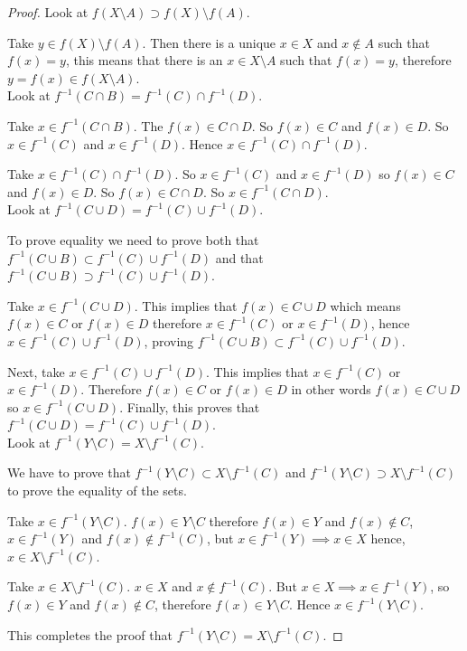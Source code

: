 \documentclass[10pt, a4paper]{article}
\begin{document}
\begin{proposition}
\begin{proof}
        Look at $f(X \setminus A) \supset f(X) \setminus f(A)$.

        Take $y \in f(X) \setminus f(A)$. Then there is a unique $x \in X$ and $x \notin A$ such that $f(x) = y$, this means that there is an $x \in X \setminus A$ such that $f(x) = y$, therefore $y = f(x) \in f(X \setminus A)$. \\

        Look at $f^{-1}(C \cap B) = f^{-1}(C) \cap f^{-1}(D)$.

        Take $x \in f^{-1}(C \cap B)$. The $f(x) \in C \cap D$. So $f(x) \in C$ and $f(x) \in D$. So $x \in f^{-1}(C)$ and $x \in f^{-1}(D)$. Hence $x \in f^{-1}(C) \cap f^{-1}(D)$.

        Take $x \in f^{-1}(C) \cap f^{-1}(D)$. So $x \in f^{-1}(C)$ and $x \in f^{-1}(D)$ so $f(x) \in C$ and $f(x) \in D$. So $f(x) \in C \cap D$. So $x \in f^{-1}(C \cap D)$. \\

        Look at $f^{-1}(C \cup D) = f^{-1}(C) \cup f^{-1}(D)$.

        To prove equality we need to prove both that $f^{-1}(C \cup B) \subset f^{-1}(C) \cup f^{-1}(D)$ and that $f^{-1}(C \cup B) \supset f^{-1}(C) \cup f^{-1}(D)$.

        Take $x \in f^{-1}(C \cup D)$. This implies that $f(x) \in C \cup D$ which means $f(x) \in C$ or $f(x) \in D$ therefore $x \in f^{-1}(C)$ or $x \in f^{-1}(D)$, hence $x \in f^{-1}(C) \cup f^{-1}(D)$, proving $f^{-1}(C \cup B) \subset f^{-1}(C) \cup f^{-1}(D)$.

        Next, take $x \in f^{-1}(C) \cup f^{-1}(D)$. This implies that $x \in f^{-1}(C)$ or $x \in f^{-1}(D)$. Therefore $f(x) \in C$ or $f(x) \in D$ in other words $f(x) \in C \cup D$ so $x \in f^{-1}(C \cup D)$. Finally, this proves that $f^{-1}(C \cup D) = f^{-1}(C) \cup f^{-1}(D)$. \\

        Look at $f^{-1}(Y \setminus C) = X \setminus f^{-1}(C)$.

        We have to prove that $f^{-1}(Y \setminus C) \subset X \setminus f^{-1}(C)$ and $f^{-1}(Y \setminus C) \supset X \setminus f^{-1}(C)$ to prove the equality of the sets.

        Take $x \in f^{-1}(Y \setminus C)$. $f(x) \in Y \setminus C$ therefore $f(x) \in Y$ and $f(x) \notin C$, $x \in f^{-1}(Y)$ and $f(x) \notin f^{-1}(C)$, but $x \in f^{-1}(Y) \implies x \in X$ hence, $x \in X \setminus f^{-1}(C)$.

        Take $x \in X \setminus f^{-1}(C)$. $x \in X$ and $x \notin f^{-1}(C)$. But $x \in X \implies x \in f^{-1}(Y)$, so $f(x) \in Y$ and $f(x) \notin C$, therefore $f(x) \in Y \setminus C$. Hence $x \in f^{-1}(Y \setminus C)$.

        This completes the proof that $f^{-1}(Y \setminus C) = X \setminus f^{-1}(C)$.
    \end{proof}
\end{proposition}
\end{document}
